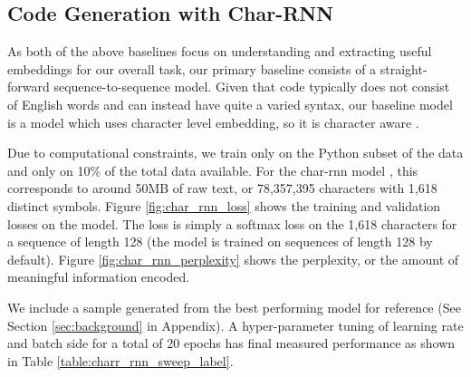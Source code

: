 \documentclass[10pt,twocolumn]{article}
\begin{document}
\subsection{Code Generation with Char-RNN}
As both of the above baselines focus on understanding and extracting useful embeddings for our overall task, our primary baseline consists of a straight-forward sequence-to-sequence model. Given that code typically does not consist of English words and can instead have quite a varied syntax, our baseline model is a model which uses character level embedding, so it is character aware \cite{charrnn}.

Due to computational constraints, we train only on the Python subset of the data and only on 10\% of the total data available. For the char-rnn model \cite{charrnn}, this corresponds to around 50MB of raw text, or 78,357,395 characters with 1,618 distinct symbols. Figure \ref{fig:char_rnn_loss} shows the training and validation losses on the model. The loss is simply a softmax loss on the 1,618 characters for a sequence of length 128 (the model is trained on sequences of length 128 by default). Figure \ref{fig:char_rnn_perplexity} shows the perplexity, or the amount of meaningful information encoded. 

We include a sample generated from the best performing model for reference (See Section \ref{sec:background} in Appendix). A hyper-parameter tuning of learning rate and batch side for a total of 20 epochs has final measured performance as shown in Table \ref{table:charr_rnn_sweep_label}.
\end{document}
